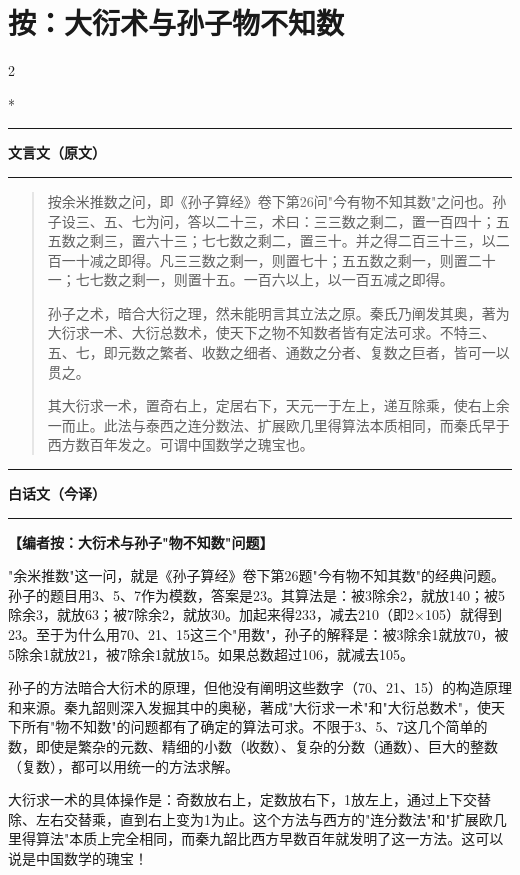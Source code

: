 \documentclass[11pt,a4paper]{article}
\newenvironment{preface}{%
  \begin{quote}\color{prefacecolor}%
}{\end{quote}}
\newcommand{\zhtext}[1]{{\chinese #1}}
\newcommand{\leftcolheader}{%
  \noindent\textcolor{leftheader}{\rule{\columnwidth}{1.5pt}}\par
  \vspace{2pt}
  \noindent\textbf{\color{leftheader}\chinese 文言文（原文）}\par
  \vspace{2pt}
  \noindent\textcolor{leftheader}{\rule{\columnwidth}{0.6pt}}\par
  \vspace{4pt}
}
\newcommand{\rightcolheader}{%
  \noindent\textcolor{rightheader}{\rule{\columnwidth}{1.5pt}}\par
  \vspace{2pt}
  \noindent\textbf{\color{rightheader}\chinese 白话文（今译）}\par
  \vspace{2pt}
  \noindent\textcolor{rightheader}{\rule{\columnwidth}{0.6pt}}\par
  \vspace{4pt}
}
\begin{document}
\newpage

\section*{\zhtext{按：大衍术与孙子物不知数}}

\begin{paracol}{2}

\switchcolumn[0]*\leftcolheader

\small
\begin{preface}
按余米推数之问，即《孙子算经》卷下第26问"今有物不知其数"之问也。孙子设三、五、七为问，答以二十三，术曰：三三数之剩二，置一百四十；五五数之剩三，置六十三；七七数之剩二，置三十。并之得二百三十三，以二百一十减之即得。凡三三数之剩一，则置七十；五五数之剩一，则置二十一；七七数之剩一，则置十五。一百六以上，以一百五减之即得。

孙子之术，暗合大衍之理，然未能明言其立法之原。秦氏乃阐发其奥，著为大衍求一术、大衍总数术，使天下之物不知数者皆有定法可求。不特三、五、七，即元数之繁者、收数之细者、通数之分者、复数之巨者，皆可一以贯之。

其大衍求一术，置奇右上，定居右下，天元一于左上，递互除乘，使右上余一而止。此法与泰西之连分数法、扩展欧几里得算法本质相同，而秦氏早于西方数百年发之。可谓中国数学之瑰宝也。
\end{preface}

\switchcolumn\rightcolheader

\small\color{prefacecolor}
\textbf{【编者按：大衍术与孙子"物不知数"问题】}

"余米推数"这一问，就是《孙子算经》卷下第26题"今有物不知其数"的经典问题。孙子的题目用3、5、7作为模数，答案是23。其算法是：被3除余2，就放140；被5除余3，就放63；被7除余2，就放30。加起来得233，减去210（即2×105）就得到23。至于为什么用70、21、15这三个"用数"，孙子的解释是：被3除余1就放70，被5除余1就放21，被7除余1就放15。如果总数超过106，就减去105。

孙子的方法暗合大衍术的原理，但他没有阐明这些数字（70、21、15）的构造原理和来源。秦九韶则深入发掘其中的奥秘，著成"大衍求一术"和"大衍总数术"，使天下所有"物不知数"的问题都有了确定的算法可求。不限于3、5、7这几个简单的数，即使是繁杂的元数、精细的小数（收数）、复杂的分数（通数）、巨大的整数（复数），都可以用统一的方法求解。

大衍求一术的具体操作是：奇数放右上，定数放右下，1放左上，通过上下交替除、左右交替乘，直到右上变为1为止。这个方法与西方的"连分数法"和"扩展欧几里得算法"本质上完全相同，而秦九韶比西方早数百年就发明了这一方法。这可以说是中国数学的瑰宝！

\end{paracol}
\end{document}
